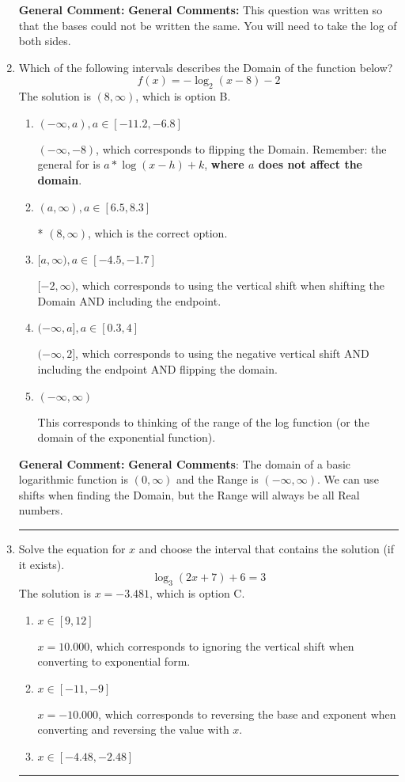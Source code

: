 \documentclass{extbook}[14pt]
\newcommand{\litem}[1]{\item #1

\rule{\textwidth}{0.4pt}}
\begin{document}
\begin{enumerate}
{\textbf{General Comment:} \textbf{General Comments:} This question was written so that the bases could not be written the same. You will need to take the log of both sides.
}
\litem{
Which of the following intervals describes the Domain of the function below?
\[ f(x) = -\log_2{(x-8)}-2 \]The solution is \( (8, \infty) \), which is option B.\begin{enumerate}[label=\Alph*.]
\item \( (-\infty, a), a \in [-11.2, -6.8] \)

$(-\infty, -8)$, which corresponds to flipping the Domain. Remember: the general for is $a*\log(x-h)+k$, \textbf{where $a$ does not affect the domain}.
\item \( (a, \infty), a \in [6.5, 8.3] \)

* $(8, \infty)$, which is the correct option.
\item \( [a, \infty), a \in [-4.5, -1.7] \)

$[-2, \infty)$, which corresponds to using the vertical shift when shifting the Domain AND including the endpoint.
\item \( (-\infty, a], a \in [0.3, 4] \)

$(-\infty, 2]$, which corresponds to using the negative vertical shift AND including the endpoint AND flipping the domain.
\item \( (-\infty, \infty) \)

This corresponds to thinking of the range of the log function (or the domain of the exponential function).
\end{enumerate}

\textbf{General Comment:} \textbf{General Comments}: The domain of a basic logarithmic function is $(0, \infty)$ and the Range is $(-\infty, \infty)$. We can use shifts when finding the Domain, but the Range will always be all Real numbers.
}
\litem{
Solve the equation for $x$ and choose the interval that contains the solution (if it exists).
\[ \log_{3}{(2x+7)}+6 = 3 \]The solution is \( x = -3.481 \), which is option C.\begin{enumerate}[label=\Alph*.]
\item \( x \in [9, 12] \)

$x = 10.000$, which corresponds to ignoring the vertical shift when converting to exponential form.
\item \( x \in [-11, -9] \)

$x = -10.000$, which corresponds to reversing the base and exponent when converting and reversing the value with $x$.
\item \( x \in [-4.48, -2.48] \)


\end{enumerate}}
\end{enumerate}
\end{document}
